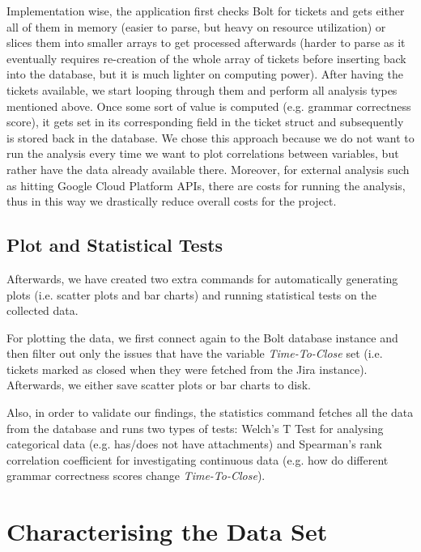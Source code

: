 \documentclass{mpaper}
\begin{document}
Implementation wise, the application first checks Bolt for tickets and gets either all of them in memory (easier to parse, 
but heavy on resource utilization) or slices them into smaller arrays to get processed afterwards (harder to parse as it 
eventually requires re-creation of the whole array of tickets before inserting back into the database, but it is much 
lighter on computing power). After having the tickets available, we start looping through them and perform all 
analysis types mentioned above. Once some sort of value is computed (e.g. grammar correctness score), it gets set in 
its corresponding field in the ticket struct and subsequently is stored back in the database. We chose this approach because 
we do not want to run the analysis every time we want to plot correlations between variables, but rather have the data 
already available there. Moreover, for external analysis such as hitting Google Cloud Platform APIs, there are costs for 
running the analysis, thus in this way we drastically reduce overall costs for the project.

\subsection{Plot and Statistical Tests}

Afterwards, we have created two extra commands for automatically generating plots (i.e. scatter plots and bar charts) and 
running statistical tests on the collected data. 

For plotting the data, we first connect again to the Bolt database instance and then filter out only the issues that have 
the variable \emph{Time-To-Close} set (i.e. tickets marked as closed when they were fetched from the Jira instance). Afterwards,
we either save scatter plots or bar charts to disk. 

Also, in order to validate our findings, the statistics command fetches all the data from the database and runs two types of 
tests: Welch's T Test \cite{welch1947generalization} for analysing categorical data (e.g. has/does not have attachments)
and Spearman's rank correlation coefficient \cite{spearman1904proof} for investigating continuous data (e.g. how do different 
grammar correctness scores change \emph{Time-To-Close}).

\section{Characterising the Data Set}\label{characterising}
\end{document}
